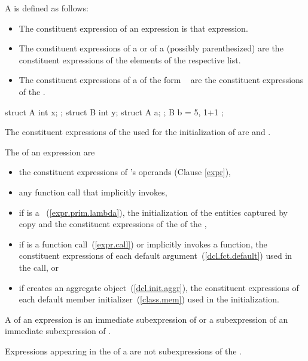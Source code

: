 \pnum
A  is defined as follows:

\begin{itemize}
\item
The constituent expression of an expression is that expression.
\item
The constituent expressions of a  or
of a (possibly parenthesized) 
are the constituent expressions of the elements of the respective list.
\item
The constituent expressions of a 
of the form \tcode{=}~
are the constituent expressions of the .
\end{itemize}
\begin{example}
\begin{codeblock}
struct A { int x; };
struct B { int y; struct A a; };
B b = { 5, { 1+1 } };
\end{codeblock}
The constituent expressions of the 
used for the initialization of  are  and .
\end{example}

\pnum
The  of an expression  are

\begin{itemize}
\item
the constituent expressions of 's operands (Clause \ref{expr}),
\item
any function call that  implicitly invokes,
\item
if  is a ~(\ref{expr.prim.lambda}),
the initialization of the entities captured by copy and
the constituent expressions of the  of the ,
\item
if  is a function call~(\ref{expr.call}) or implicitly invokes a function,
the constituent expressions of each default argument~(\ref{dcl.fct.default})
used in the call, or
\item
if  creates an aggregate object~(\ref{dcl.init.aggr}),
the constituent expressions of each default member initializer~(\ref{class.mem})
used in the initialization.
\end{itemize}

\pnum
A  of an expression  is
an immediate subexpression of  or
a subexpression of an immediate subexpression of .
\begin{note}
Expressions appearing in the  of a 
are not subexpressions of the .
\end{note}

